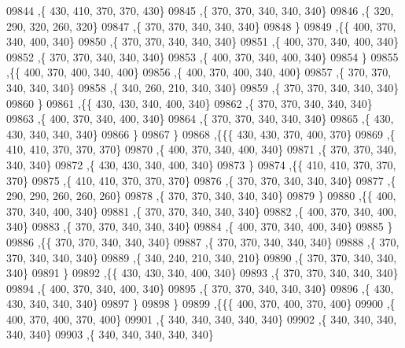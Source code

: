 \begin{DoxyCode}
09844     ,\{   430,   410,   370,   370,   430\}
09845     ,\{   370,   370,   340,   340,   340\}
09846     ,\{   320,   290,   320,   260,   320\}
09847     ,\{   370,   370,   340,   340,   340\}
09848     \}
09849    ,\{\{   400,   370,   340,   400,   340\}
09850     ,\{   370,   370,   340,   340,   340\}
09851     ,\{   400,   370,   340,   400,   340\}
09852     ,\{   370,   370,   340,   340,   340\}
09853     ,\{   400,   370,   340,   400,   340\}
09854     \}
09855    ,\{\{   400,   370,   400,   340,   400\}
09856     ,\{   400,   370,   400,   340,   400\}
09857     ,\{   370,   370,   340,   340,   340\}
09858     ,\{   340,   260,   210,   340,   340\}
09859     ,\{   370,   370,   340,   340,   340\}
09860     \}
09861    ,\{\{   430,   430,   340,   400,   340\}
09862     ,\{   370,   370,   340,   340,   340\}
09863     ,\{   400,   370,   340,   400,   340\}
09864     ,\{   370,   370,   340,   340,   340\}
09865     ,\{   430,   430,   340,   340,   340\}
09866     \}
09867    \}
09868   ,\{\{\{   430,   430,   370,   400,   370\}
09869     ,\{   410,   410,   370,   370,   370\}
09870     ,\{   400,   370,   340,   400,   340\}
09871     ,\{   370,   370,   340,   340,   340\}
09872     ,\{   430,   430,   340,   400,   340\}
09873     \}
09874    ,\{\{   410,   410,   370,   370,   370\}
09875     ,\{   410,   410,   370,   370,   370\}
09876     ,\{   370,   370,   340,   340,   340\}
09877     ,\{   290,   290,   260,   260,   260\}
09878     ,\{   370,   370,   340,   340,   340\}
09879     \}
09880    ,\{\{   400,   370,   340,   400,   340\}
09881     ,\{   370,   370,   340,   340,   340\}
09882     ,\{   400,   370,   340,   400,   340\}
09883     ,\{   370,   370,   340,   340,   340\}
09884     ,\{   400,   370,   340,   400,   340\}
09885     \}
09886    ,\{\{   370,   370,   340,   340,   340\}
09887     ,\{   370,   370,   340,   340,   340\}
09888     ,\{   370,   370,   340,   340,   340\}
09889     ,\{   340,   240,   210,   340,   210\}
09890     ,\{   370,   370,   340,   340,   340\}
09891     \}
09892    ,\{\{   430,   430,   340,   400,   340\}
09893     ,\{   370,   370,   340,   340,   340\}
09894     ,\{   400,   370,   340,   400,   340\}
09895     ,\{   370,   370,   340,   340,   340\}
09896     ,\{   430,   430,   340,   340,   340\}
09897     \}
09898    \}
09899   ,\{\{\{   400,   370,   400,   370,   400\}
09900     ,\{   400,   370,   400,   370,   400\}
09901     ,\{   340,   340,   340,   340,   340\}
09902     ,\{   340,   340,   340,   340,   340\}
09903     ,\{   340,   340,   340,   340,   340\}

\end{DoxyCode}
